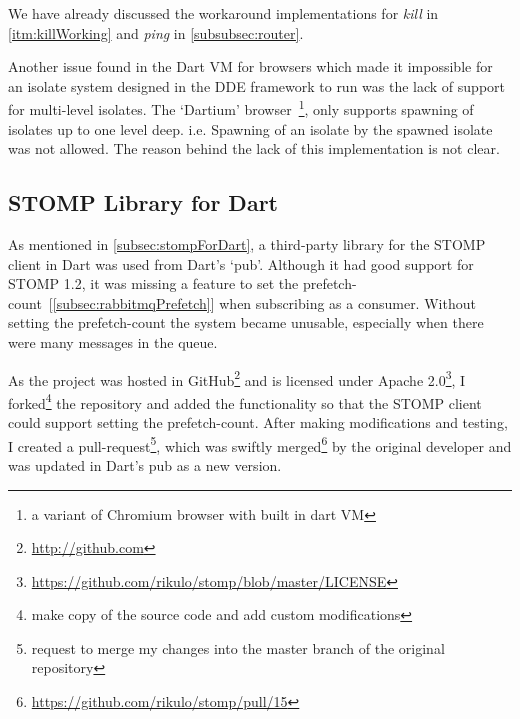   We have already discussed the workaround implementations for \emph{kill} in \autoref{itm:killWorking} and \emph{ping} in \autoref{subsubsec:router}.

  Another issue found in the Dart VM for browsers which made it impossible for an isolate system designed in the DDE framework to run was the lack of support for multi-level isolates. The ‘Dartium’ browser~\footnote{a variant of Chromium browser with built in dart VM}, only supports spawning of isolates up to one level deep. i.e. Spawning of an isolate by the spawned isolate was not allowed. The reason behind the lack of this implementation is not clear.

\subsection{STOMP Library for Dart}
  As mentioned in \autoref{subsec:stompForDart}, a third-party library for the STOMP client in Dart was used from Dart's ‘pub’. Although it had good support for STOMP 1.2, it was missing a feature to set the prefetch-count~[\autoref{subsec:rabbitmqPrefetch}] when subscribing as a consumer. Without setting the prefetch-count the system became unusable, especially when there were many messages in the queue.

  As the project was hosted in GitHub\footnote{\url{http://github.com}} and is licensed under Apache 2.0\footnote{\url{https://github.com/rikulo/stomp/blob/master/LICENSE}}, I forked\footnote{make copy of the source code and add custom modifications} the repository and added the functionality so that the STOMP client could support setting the prefetch-count. After making modifications and testing, I created a pull-request\footnote{request to merge my changes into the master branch of the original repository}, which was swiftly merged\footnote{\url{https://github.com/rikulo/stomp/pull/15}} by the original developer and was updated in Dart's pub as a new version.
